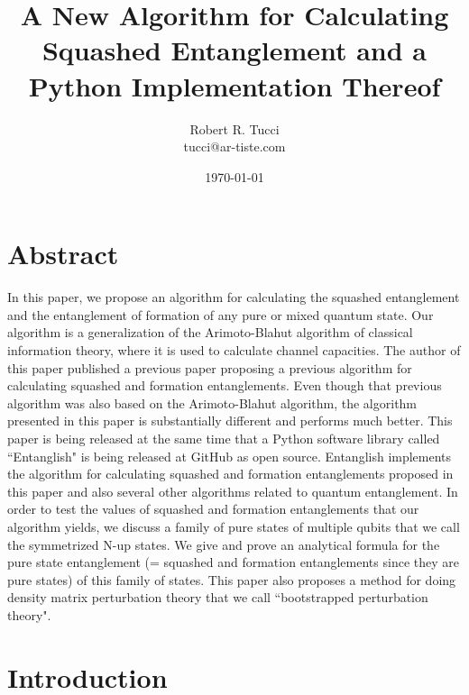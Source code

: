 \documentclass[12pt]{article}%
\begin{document}
\title{A New  Algorithm for Calculating\\
Squashed Entanglement and a \\Python Implementation Thereof}


\author{Robert R. Tucci\\
        tucci@ar-tiste.com}


\date{ \today}

\maketitle

\vskip2cm
\section*{Abstract}
In this paper, we propose an algorithm
for calculating the squashed entanglement
and the entanglement of formation
of
any pure or mixed quantum state.
Our algorithm is a generalization
of the Arimoto-Blahut algorithm
 of classical
information theory,
where it is used to calculate channel capacities.
The author of this paper
published
a previous paper proposing a previous algorithm
for calculating squashed and formation entanglements.
Even though that previous algorithm was
also based on the Arimoto-Blahut algorithm, the
algorithm presented in this paper is
substantially different and performs much better.
This paper is being released at the same time that
a Python software library called ``Entanglish"
is being released at GitHub as open source.
Entanglish implements the algorithm for
calculating squashed and formation entanglements proposed
in this paper and also several other algorithms related
to quantum entanglement.
In order to test
the values of squashed and formation
entanglements that our algorithm
yields, we discuss
a family of pure states of multiple qubits
that we call the symmetrized N-up states.
We give and prove an analytical formula
for the pure state entanglement
(= squashed and formation entanglements since they are pure states) of this
family of states.
This paper also proposes a method for doing density matrix perturbation theory that we call
  ``bootstrapped perturbation theory".








\newpage
\section{Introduction}
\end{document}
